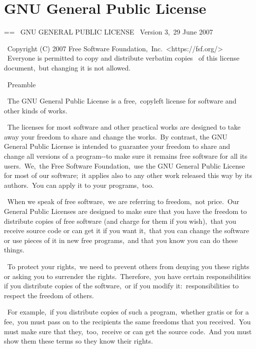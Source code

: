 \documentclass{book}
\makeatletter
\newenvironment{Texinfopreformatted}{%
  \par\GNUTobeylines\obeyspaces\frenchspacing\parskip=\z@\parindent=\z@}{}
{\catcode`\^^M=13 \gdef\GNUTobeylines{\catcode`\^^M=13 \def^^M{\null\par}}}
\newenvironment{Texinfoindented}{\begin{list}{}{}\item\relax}{\end{list}}
\renewcommand{\_}{\Texinfounderscore\discretionary{}{}{}}
\makeatother
\begin{document}
\chapter{{GNU General Public License}}
\label{anchor:GNU-General-Public-License}%

\begin{Texinfoindented}
\begin{Texinfopreformatted}%
\ttfamily \                    GNU GENERAL PUBLIC LICENSE
\                       Version 3,\ 29 June 2007

\ Copyright (C) 2007 Free Software Foundation,\ Inc.\ <https://fsf.org/>
\ Everyone is permitted to copy and distribute verbatim copies
\ of this license document,\ but changing it is not allowed.

\                            Preamble

\  The GNU General Public License is a free,\ copyleft license for
software and other kinds of works.

\  The licenses for most software and other practical works are designed
to take away your freedom to share and change the works.\  By contrast,
the GNU General Public License is intended to guarantee your freedom to
share and change all versions of a program{-}{-}to make sure it remains free
software for all its users.\  We,\ the Free Software Foundation,\ use the
GNU General Public License for most of our software;\ it applies also to
any other work released this way by its authors.\  You can apply it to
your programs,\ too.

\  When we speak of free software,\ we are referring to freedom,\ not
price.\  Our General Public Licenses are designed to make sure that you
have the freedom to distribute copies of free software (and charge for
them if you wish),\ that you receive source code or can get it if you
want it,\ that you can change the software or use pieces of it in new
free programs,\ and that you know you can do these things.

\  To protect your rights,\ we need to prevent others from denying you
these rights or asking you to surrender the rights.\  Therefore,\ you have
certain responsibilities if you distribute copies of the software,\ or if
you modify it:\ responsibilities to respect the freedom of others.

\  For example,\ if you distribute copies of such a program,\ whether
gratis or for a fee,\ you must pass on to the recipients the same
freedoms that you received.\  You must make sure that they,\ too,\ receive
or can get the source code.\  And you must show them these terms so they
know their rights.


\end{Texinfopreformatted}
\end{Texinfoindented}
\end{document}
